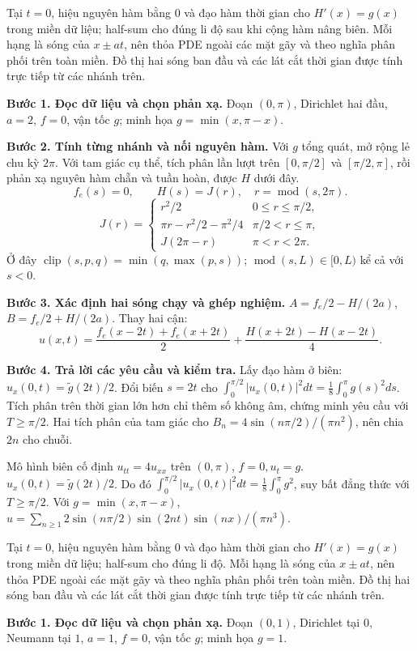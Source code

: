 Tại $t=0$, hiệu nguyên hàm bằng $0$ và đạo hàm thời gian cho $H'(x)=g(x)$ trong miền dữ liệu; half-sum cho đúng li độ sau khi cộng hàm nâng biên. Mỗi hạng là sóng của $x\pm at$, nên thỏa PDE ngoài các mặt gãy và theo nghĩa phân phối trên toàn miền. Đồ thị hai sóng ban đầu và các lát cắt thời gian được tính trực tiếp từ các nhánh trên.

\textbf{Bước 1. Đọc dữ liệu và chọn phản xạ.} Đoạn $(0,\pi)$, Dirichlet hai đầu, $a=2$, $f=0$, vận tốc $g$; minh họa $g=\min(x,\pi-x)$.

\textbf{Bước 2. Tính từng nhánh và nối nguyên hàm.} Với $g$ tổng quát, mở rộng lẻ chu kỳ $2\pi$. Với tam giác cụ thể, tích phân lần lượt trên $[0,\pi/2]$ và $[\pi/2,\pi]$, rồi phản xạ nguyên hàm chẵn và tuần hoàn, được $H$ dưới đây.
\[f_e(s)=0,\qquad H(s)=J(r),\quad r=\operatorname{mod}(s,2\pi).\]
\[J(r)=\begin{cases}r^2/2&0\le r\le\pi/2,\\\pi r-r^2/2-\pi^2/4&\pi/2<r\le\pi,\\J(2\pi-r)&\pi<r<2\pi.\end{cases}\]
Ở đây $\operatorname{clip}(s,p,q)=\min(q,\max(p,s))$; $\operatorname{mod}(s,L)\in[0,L)$ kể cả với $s<0$.

\textbf{Bước 3. Xác định hai sóng chạy và ghép nghiệm.} $A=f_e/2-H/(2a)$, $B=f_e/2+H/(2a)$. Thay hai cận:
\[u(x,t)=\frac{f_e(x-2t)+f_e(x+2t)}2+\frac{H(x+2t)-H(x-2t)}{4}.\]

\textbf{Bước 4. Trả lời các yêu cầu và kiểm tra.} Lấy đạo hàm ở biên: $u_x(0,t)=\widetilde g(2t)/2$. Đổi biến $s=2t$ cho $\int_0^{\pi/2}|u_x(0,t)|^2dt=\frac18\int_0^\pi g(s)^2ds$. Tích phân trên thời gian lớn hơn chỉ thêm số không âm, chứng minh yêu cầu với $T\ge\pi/2$. Hai tích phân của tam giác cho $B_n=4\sin(n\pi/2)/(\pi n^2)$, nên chia $2n$ cho chuỗi.

Mô hình biên cố định $u_{tt}=4u_{xx}$ trên $(0,\pi)$, $f=0,u_t=g$. $u_x(0,t)=\widetilde g(2t)/2$. Do đó $\int_0^{\pi/2}|u_x(0,t)|^2dt=\frac18\int_0^\pi g^2$, suy bất đẳng thức với $T\ge\pi/2$. Với $g=\min(x,\pi-x)$, $u=\sum_{n\ge1}2\sin(n\pi/2)\sin(2nt)\sin(nx)/(\pi n^3)$.

Tại $t=0$, hiệu nguyên hàm bằng $0$ và đạo hàm thời gian cho $H'(x)=g(x)$ trong miền dữ liệu; half-sum cho đúng li độ. Mỗi hạng là sóng của $x\pm at$, nên thỏa PDE ngoài các mặt gãy và theo nghĩa phân phối trên toàn miền. Đồ thị hai sóng ban đầu và các lát cắt thời gian được tính trực tiếp từ các nhánh trên.

\textbf{Bước 1. Đọc dữ liệu và chọn phản xạ.} Đoạn $(0,1)$, Dirichlet tại $0$, Neumann tại $1$, $a=1$, $f=0$, vận tốc $g$; minh họa $g=1$.

